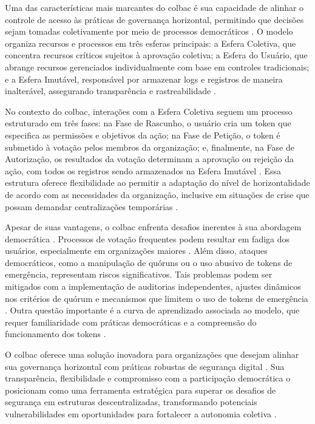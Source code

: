 Uma das características mais marcantes do \gls{colbac} é sua capacidade de
alinhar o controle de acesso às práticas de governança horizontal,
permitindo que decisões sejam tomadas coletivamente por meio de
processos democráticos \cite{ParticipatoryThreatModelling}.
O modelo organiza recursos e processos em três esferas
principais: a Esfera Coletiva, que concentra recursos críticos
sujeitos à aprovação coletiva; a Esfera do Usuário, que abrange
recursos gerenciados individualmente com base em controles
tradicionais; e a Esfera Imutável, responsável por armazenar logs e
registros de maneira inalterável, assegurando transparência e
rastreabilidade \cite{Colbac}.

No contexto do \gls{colbac}, interações com a Esfera Coletiva seguem um
processo estruturado em três fases: na Fase de Rascunho, o usuário
cria um token que especifica as permissões e objetivos da ação; na
Fase de Petição, o token é submetido à votação pelos membros da
organização; e, finalmente, na Fase de Autorização, os resultados da
votação determinam a aprovação ou rejeição da ação, com todos os
registros sendo armazenados na Esfera Imutável \cite{Colbac}. Essa
estrutura oferece flexibilidade ao permitir a adaptação do nível de
horizontalidade de acordo com as necessidades da organização,
inclusive em situações de crise que possam demandar centralizações
temporárias \cite{Colbac}.

Apesar de suas vantagens, o \gls{colbac} enfrenta desafios inerentes à sua
abordagem democrática \cite{Colbac}. Processos de votação frequentes podem resultar
em fadiga dos usuários, especialmente em organizações maiores
\cite{Colbac, EverydayRevolutions}.
Além disso, ataques democráticos, como a manipulação de quóruns ou o uso
abusivo de tokens de emergência, representam riscos significativos.
Tais problemas podem ser mitigados com a implementação de auditorias
independentes, ajustes dinâmicos nos critérios de quórum e mecanismos
que limitem o uso de tokens de emergência \cite{Colbac}. Outra questão importante é
a curva de aprendizado associada ao modelo, que requer familiaridade
com práticas democráticas e a compreensão do funcionamento dos tokens
\cite{Colbac}.

O \gls{colbac} oferece uma solução inovadora para organizações que desejam
alinhar sua governança horizontal com práticas robustas de segurança
digital \cite{Colbac}. Sua transparência, flexibilidade e compromisso com a
participação democrática o posicionam como uma ferramenta estratégica
para superar os desafios de segurança em estruturas descentralizadas,
transformando potenciais vulnerabilidades em oportunidades para
fortalecer a autonomia coletiva \cite{Colbac, EverydayRevolutions}.

